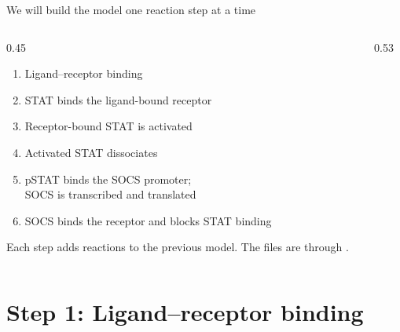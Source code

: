\documentclass[aspectratio=169,10pt,t]{beamer}
\begin{document}
\begin{frame}{We will build the model one reaction step at a time}
  \begin{columns}[c]
    \begin{column}{0.45\textwidth}
      \begin{enumerate}[<+->]
        \setlength\itemsep{1.2mm}
        \item Ligand--receptor binding
        \item STAT binds the ligand-bound receptor
        \item Receptor-bound STAT is activated
        \item Activated STAT dissociates
        \item pSTAT binds the SOCS promoter;\\ SOCS is transcribed and translated
        \item SOCS binds the receptor and blocks STAT binding
      \end{enumerate}
      \vskip2mm
      {\small Each step adds reactions to the previous model. The files are
       through
      .}
    \end{column}
    \begin{column}{0.53\textwidth}
      \centering
    \end{column}
  \end{columns}
\end{frame}

\section{Step 1: Ligand--receptor binding}
\end{document}
